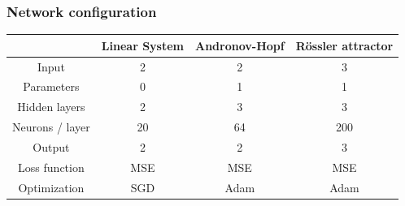 \begin{frame}
	\frametitle{Network configuration}
	\centering
	\begin{tabular} { c | c | c | c}
		& Linear System & Andronov-Hopf & R\"ossler attractor	\\
		\hline
		Input			& 2 		& 2			& 3			\\
		\hline
		Parameters		& 0			& 1			& 1			\\
		\hline
		Hidden layers	& 2			& 3			& 3			\\
		\hline
		Neurons / layer	& 20		& 64		& 200		\\
		\hline
		Output			& 2			& 2			& 3			\\
		\hline
		Loss function	& MSE		& MSE		& MSE		\\
		\hline
		Optimization	& SGD		& Adam		& Adam		\\
	\end{tabular}
\end{frame}

